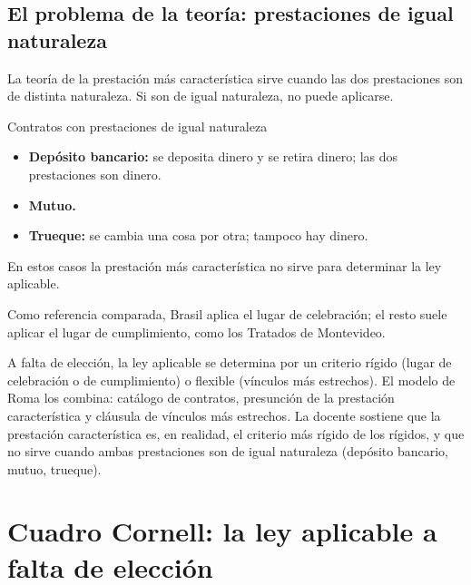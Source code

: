 \documentclass[12pt,oneside]{book}
\begin{document}
\subsection{El problema de la teoría: prestaciones de igual naturaleza}

La teoría de la prestación más característica sirve cuando las dos prestaciones son de distinta naturaleza. Si son de igual naturaleza, no puede aplicarse.

\begin{example}{Contratos con prestaciones de igual naturaleza}
\begin{itemize}
    \item \textbf{Depósito bancario:} se deposita dinero y se retira dinero; las dos prestaciones son dinero.
    \item \textbf{Mutuo.}
    \item \textbf{Trueque:} se cambia una cosa por otra; tampoco hay dinero.
\end{itemize}
En estos casos la prestación más característica no sirve para determinar la ley aplicable.
\end{example}

Como referencia comparada, Brasil aplica el lugar de celebración; el resto suele aplicar el lugar de cumplimiento, como los Tratados de Montevideo.

\begin{important}
A falta de elección, la ley aplicable se determina por un criterio rígido (lugar de celebración o de cumplimiento) o flexible (vínculos más estrechos). El modelo de Roma los combina: catálogo de contratos, presunción de la prestación característica y cláusula de vínculos más estrechos. La docente sostiene que la prestación característica es, en realidad, el criterio más rígido de los rígidos, y que no sirve cuando ambas prestaciones son de igual naturaleza (depósito bancario, mutuo, trueque).
\end{important}

\section{Cuadro Cornell: la ley aplicable a falta de elección}
\end{document}
